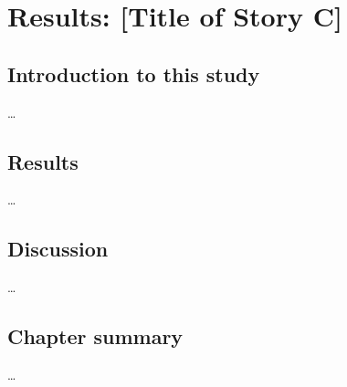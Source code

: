\chapter{Results: [Title of Story C]}
\label{ch:resultsC}

\section{Introduction to this study}
\label{sec:resC-intro}
\ldots{}

\section{Results}
\label{sec:resC-results}
\ldots{}

\section{Discussion}
\label{sec:resC-disc}
\ldots{}

\section{Chapter summary}
\label{sec:resC-sum}
\ldots{}
